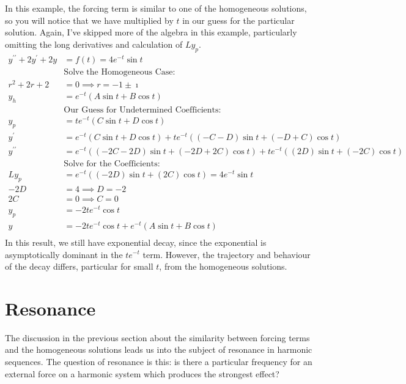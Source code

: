 \documentclass[fleqn,letterpaper]{report}
\begin{document}
\begin{example}
In this example, the forcing term is similar to one of the
homogeneous solutions, so you will notice that we have
multiplied by $t$ in our guess for the particular solution.
Again, I've skipped more of the algebra in this example,
particularly omitting the long derivatives and calculation of
$Ly_p$.
\begin{align*}
y^{\prime \prime} + 2y^\prime + 2y & = f(t) = 4e^{-t} \sin t \\
& \text{Solve the Homogeneous Case:} \\
r^2 + 2r + 2 & = 0 \implies r = -1 \pm \imath \\
y_h & = e^{-t} (A \sin t + B \cos t) \\
& \text{Our Guess for Undetermined Coefficients:} \\
y_p & = te^{-t} (C \sin t + D \cos t ) \\
y^{\prime} & = e^{-t} (C \sin t + D \cos t) + te^{-t}((-C-D)\sin t
+ (-D+C)\cos t) \\
y^{\prime\prime} & = e^{-t} ((-2C-2D) \sin t + (-2D+2C) \cos t)
+ te^{-t}((2D)\sin t + (-2C)\cos t) \\
& \text{Solve for the Coefficients:} \\
L y_p & = e^{-t} ((-2D) \sin t + (2C) \cos t) = 4e^{-t} \sin t \\
-2D & = 4 \implies D = -2 \\
2C & = 0 \implies C = 0 \\
y_p & = -2te^{-t} \cos t \\
y & = -2te^{-t} \cos t + e^{-t} (A \sin t + B \cos t) \\
\end{align*}
In this result, we still have exponential decay, since the
exponential is asymptotically dominant in the $te^{-t}$ term.
However, the trajectory and behaviour of the decay differs,
particular for small $t$, from the homogeneous solutions.
\end{example}

\section{Resonance}
\label{resonance}

The discussion in the previous section about the similarity
between forcing terms and the homogeneous solutions leads us
into the subject of resonance in harmonic sequences. The
question of resonance is this: is there a particular frequency
for an external force on a harmonic system which produces the
strongest effect? 
\end{document}

